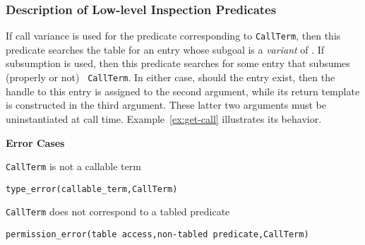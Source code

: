 \begin{description}
\subsubsection*{Description of Low-level Inspection Predicates}
\begin{description}


%
  If call
variance is used for the predicate corresponding to {\tt CallTerm},
then this predicate searches the table for an entry whose subgoal is a
\emph{variant} of .  If subsumption is used, then this
predicate searches for some entry that subsumes (properly or not) {\tt
  CallTerm}.  In either case, should the entry exist, then the handle
to this entry is assigned to the second argument, while its return
template is constructed in the third argument.  These latter two
arguments must be uninstantiated at call time.
Example~\ref{ex:get-call} illustrates its behavior.

{\bf Error Cases}
\bi
\item {\tt CallTerm} is not a callable term
\bi
\item {\tt type\_error(callable\_term,CallTerm)}
\ei
\item {\tt CallTerm} does not correspond to a tabled predicate
\bi
\item 	{\tt permission\_error(table access,non-tabled predicate,{\tt CallTerm})}

\ei
\ei
\ \\
\begin{minipage}{6in}
\end{minipage}
\end{description}
\end{description}
